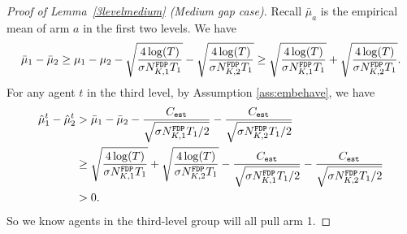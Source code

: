 \begin{proof}[Proof of Lemma~\ref{3levelmedium} (Medium gap case)]
  Recall $\bar{\mu}_a$ is
  the empirical mean of arm $a$ in the first two levels. We have
\[
\bar{\mu}_1 - \bar{\mu}_2 \geq \mu_1 -\mu_2 - \sqrt{\frac{4\log(T)}{\NG\fdpN[1]T_1}} - \sqrt{\frac{4\log(T)}{\NG\fdpN[2]T_1}} \geq  \sqrt{\frac{4\log(T)}{\NG\fdpN[1]T_1}}
+ \sqrt{\frac{4\log(T)}{\NG\fdpN[2]T_1}}.
\]
For any agent $t$ in the third level, by Assumption \ref{ass:embehave}, we have
\begin{align*}
\hat{\mu}_1^t - \hat{\mu}_2^t &>\bar{\mu}_1 - \bar{\mu}_2 - \frac{\estC}{\sqrt{\NG\fdpN[1]T_1/2}} - \frac{\estC}{\sqrt{\NG\fdpN[2]T_1/2}}\\
&\geq  \sqrt{\frac{4\log(T)}{\NG\fdpN[1]T_1}} + \sqrt{\frac{4\log(T)}{\NG\fdpN[2]T_1}}- \frac{\estC}{\sqrt{\NG\fdpN[1]T_1/2}} - \frac{\estC}{\sqrt{\NG\fdpN[2]T_1/2}}\\
 &> 0.
\end{align*}
So we know agents in the third-level group will all pull arm 1. 
\end{proof}


